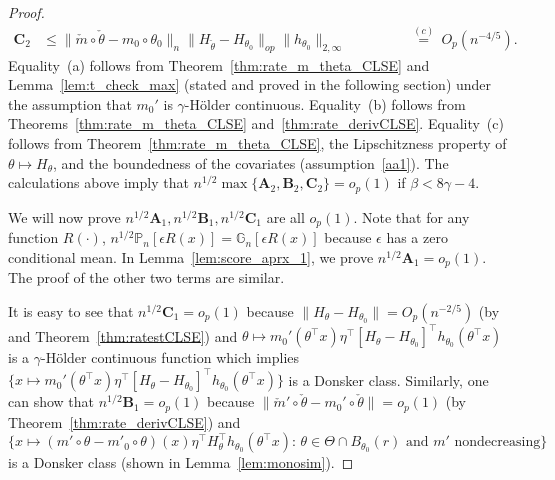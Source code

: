 \begin{proof}
\begin{align*}
\mathbf{C}_2 &\le \|\check{m}\circ\check{\theta} - m_0\circ\theta_0\|_{n}\|H_{\check\theta} - H_{\theta_0}\|_{op}\|h_{\theta_0}\|_{2,\infty}\qquad\qquad\; ~\overset{(c)}{=}~ O_p(n^{-4/5}).
\end{align*}
Equality~(a) follows from Theorem~\ref{thm:rate_m_theta_CLSE} and Lemma~\ref{lem:t_check_max} (stated and proved in the following section) under the assumption that $m_0'$ is $\gamma$-H{\"o}lder continuous. Equality~(b) follows from Theorems~\ref{thm:rate_m_theta_CLSE} and~\ref{thm:rate_derivCLSE}. { Equality~(c) follows from Theorem~\ref{thm:rate_m_theta_CLSE}, the Lipschitzness property of $\theta\mapsto H_{\theta}$, and the boundedness of the covariates (assumption~\ref{aa1}). The calculations above imply that $n^{1/2}\max\{\mathbf{A}_2, \mathbf{B}_2, \mathbf{C}_2\} = o_p(1)$ if $\beta < 8 \gamma-4$. }

We will now prove $n^{1/2}\mathbf{A}_1, n^{1/2}\mathbf{B}_1, n^{1/2}\mathbf{C}_1$ are all $o_p(1)$.  Note that for any function $R(\cdot)$, $n^{1/2}\mathbb{P}_n[\epsilon R(x)] = \mathbb{G}_n[\epsilon R(x)]$ because $\epsilon$ has a zero conditional mean. In Lemma~\ref{lem:score_aprx_1}, we prove $n^{1/2}\mathbf{A}_1 = o_p(1)$. The proof of the other two terms are similar. 

It is easy to see that $n^{1/2}\mathbf{C}_1 = o_p(1)$ because $\|H_{\theta} - H_{\theta_0}\| = O_p(n^{-2/5})$ (by~\cite[Lemma 1, part c]{Patra16} and Theorem~\ref{thm:ratestCLSE}) and $\theta\mapsto m_0'(\theta^{\top}x)\eta^{\top}[H_{\theta} - H_{\theta_0}]^{\top}h_{\theta_0}(\theta^{\top}x)$ is a $\gamma$-H{\"o}lder continuous function which implies $\{x\mapsto m_0'(\theta^{\top}x)\eta^{\top}[H_{\theta} - H_{\theta_0}]^{\top}h_{\theta_0}(\theta^{\top}x)\}$ is a Donsker class. Similarly, one can show that $n^{1/2}\mathbf{B}_1 = o_p(1)$ because $\|\check{m}'\circ\check{\theta} - m_0'\circ\check\theta\| = o_p(1)$ (by Theorem~\ref{thm:rate_derivCLSE}) and $\{x\mapsto({m}'\circ{\theta} - m'_0\circ\theta)(x)\eta^{\top}H_{\theta}^{\top}h_{\theta_0}(\theta^{\top}x):\,\theta\in\Theta\cap B_{\theta_0}(r)\mbox{ and }m'\mbox{ nondecreasing}\}$ is a Donsker class (shown in Lemma~\ref{lem:monosim}).
%
\end{proof}
